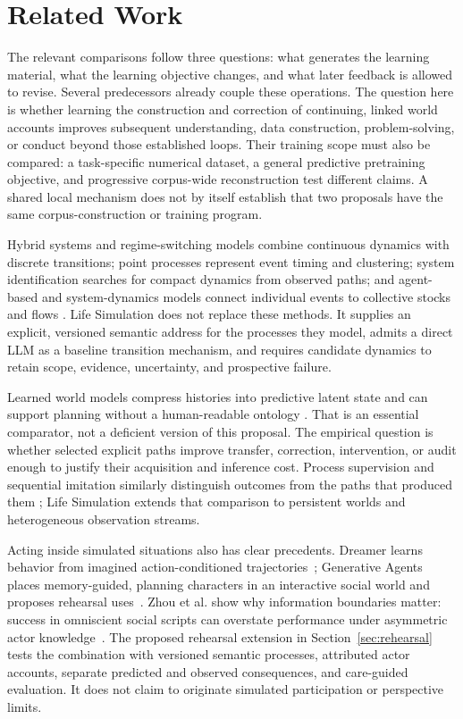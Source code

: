 \documentclass[10pt]{article}
\begin{document}
\section{Related Work}
\label{sec:related}

The relevant comparisons follow three questions: what generates the learning
material, what the learning objective changes, and what later feedback is
allowed to revise. Several predecessors already couple these operations.
The question here is whether learning the construction and correction of
continuing, linked world accounts improves subsequent understanding, data
construction, problem-solving, or conduct beyond those established loops.
Their training scope must also be compared: a task-specific numerical dataset,
a general predictive pretraining objective, and progressive corpus-wide
reconstruction test different claims. A shared local mechanism does not by
itself establish that two proposals have the same corpus-construction or
training program.

Hybrid systems and regime-switching models combine continuous dynamics with
discrete transitions; point processes represent event timing and clustering;
system identification searches for compact dynamics from observed paths; and
agent-based and system-dynamics models connect individual events to collective
stocks and flows
\cite{goebel2009hybrid,hawkes1971,brunton2016sindy,
epsteinAxtell1996artificialSocieties,forrester1961industrialDynamics}.
Life Simulation does not replace these methods. It supplies an explicit,
versioned semantic address for the processes they model, admits a direct LLM as
a baseline transition mechanism, and requires candidate dynamics to retain
scope, evidence, uncertainty, and prospective failure.

Learned world models compress histories into predictive latent state and can
support planning without a human-readable ontology
\cite{haSchmidhuber2018worldModels,hafner2025dreamer,
schrittwieser2020muzero}. That is an essential comparator, not a deficient
version of this proposal. The empirical question is whether selected explicit
paths improve transfer, correction, intervention, or audit enough to justify
their acquisition and inference cost. Process supervision and sequential
imitation similarly distinguish outcomes from the paths that produced them
\cite{lightman2023verify,ross2011dagger}; Life Simulation extends that
comparison to persistent worlds and heterogeneous observation streams.

Acting inside simulated situations also has clear precedents. Dreamer learns
behavior from imagined action-conditioned trajectories~\cite{hafner2025dreamer};
Generative Agents places memory-guided, planning characters in an interactive
social world and proposes rehearsal uses~\cite{park2023}. Zhou et al. show why
information boundaries matter: success in omniscient social scripts can
overstate performance under asymmetric actor knowledge~\cite{zhou2024socialSimulation}.
The proposed rehearsal extension in Section~\ref{sec:rehearsal} tests the
combination with versioned semantic processes, attributed actor accounts,
separate predicted and observed consequences, and care-guided evaluation.
It does not claim to originate simulated participation or perspective limits.
\end{document}
